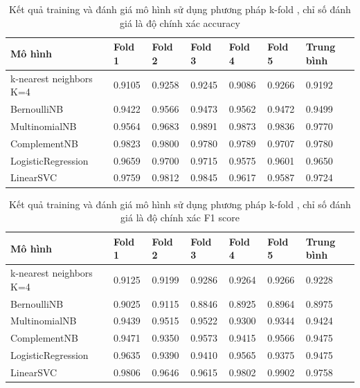 \documentclass[../DoAn.tex]{subfiles}
\begin{document}
\begin{table}[]
\caption{Kết quả training và đánh giá mô hình sử dụng phương pháp k-fold , chỉ số đánh giá là độ chính xác accuracy}
\label{tab:accu}
\begin{tabular}{@{}lllllll@{}}
\toprule
Mô hình                 & Fold 1 & Fold 2 & Fold 3 & Fold 4 & Fold 5 & Trung bình \\ \midrule
k-nearest neighbors K=4 & 0.9105 & 0.9258 & 0.9245 & 0.9086 & 0.9266 & 0.9192     \\
BernoulliNB             & 0.9422 & 0.9566 & 0.9473 & 0.9562 & 0.9472 & 0.9499     \\
MultinomialNB           & 0.9564 & 0.9683 & 0.9891 & 0.9873 & 0.9836 & 0.9770     \\
ComplementNB            & 0.9823 & 0.9800 & 0.9780 & 0.9789 & 0.9707 & 0.9780     \\
LogisticRegression      & 0.9659 & 0.9700 & 0.9715 & 0.9575 & 0.9601 & 0.9650     \\
LinearSVC               & 0.9759 & 0.9812 & 0.9845 & 0.9617 & 0.9587 & 0.9724     \\ \bottomrule
\end{tabular}
\end{table}

\begin{table}[]
\caption{Kết quả training và đánh giá mô hình sử dụng phương pháp k-fold , chỉ số đánh giá là độ chính xác F1 score}
\label{tab:f1score}
\begin{tabular}{lllllll}
\hline
Mô hình                 & Fold 1 & Fold 2 & Fold 3 & Fold 4 & Fold 5 & Trung bình \\ \hline
k-nearest neighbors K=4 & 0.9125 & 0.9199 & 0.9286 & 0.9264 & 0.9266 & 0.9228     \\
BernoulliNB             & 0.9025 & 0.9115 & 0.8846 & 0.8925 & 0.8964 & 0.8975     \\
MultinomialNB           & 0.9439 & 0.9515 & 0.9522 & 0.9300 & 0.9344 & 0.9424     \\
ComplementNB            & 0.9471 & 0.9350 & 0.9573 & 0.9415 & 0.9566 & 0.9475     \\
LogisticRegression      & 0.9635 & 0.9390 & 0.9410 & 0.9565 & 0.9375 & 0.9475     \\
LinearSVC               & 0.9806 & 0.9646 & 0.9615 & 0.9802 & 0.9902 & 0.9758     \\ \hline
\end{tabular}
\end{table}
\end{document}
